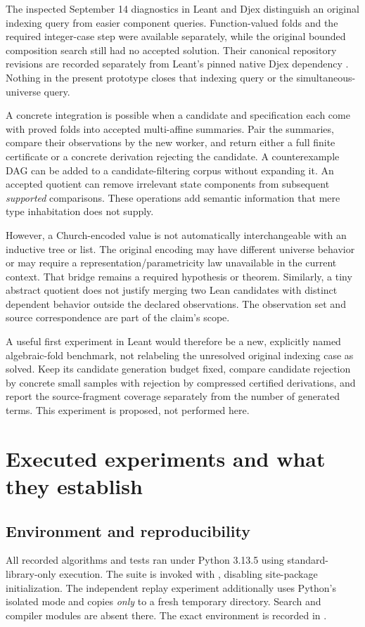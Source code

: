 \documentclass[11pt,letterpaper]{article}
\theoremstyle{definition}\newtheorem{definition}[theorem]{Definition}
\theoremstyle{remark}\newtheorem{remark}[theorem]{Remark}
\newcommand{\code}[1]{\texttt{\detokenize{#1}}}
\begin{document}
The inspected September 14 diagnostics in Leant and Djex distinguish an original indexing query from easier component queries. Function-valued folds and the required integer-case step were available separately, while the original bounded composition search still had no accepted solution. Their canonical repository revisions are recorded separately from Leant's pinned native Djex dependency \cite{leant,djex}. Nothing in the present prototype closes that indexing query or the simultaneous-universe query.

A concrete integration is possible when a candidate and specification each come with proved folds into accepted multi-affine summaries. Pair the summaries, compare their observations by the new worker, and return either a full finite certificate or a concrete derivation rejecting the candidate. A counterexample DAG can be added to a candidate-filtering corpus without expanding it. An accepted quotient can remove irrelevant state components from subsequent \emph{supported} comparisons. These operations add semantic information that mere type inhabitation does not supply.

However, a Church-encoded value is not automatically interchangeable with an inductive tree or list. The original encoding may have different universe behavior or may require a representation/parametricity law unavailable in the current context. That bridge remains a required hypothesis or theorem. Similarly, a tiny abstract quotient does not justify merging two Lean candidates with distinct dependent behavior outside the declared observations. The observation set and source correspondence are part of the claim's scope.

A useful first experiment in Leant would therefore be a new, explicitly named algebraic-fold benchmark, not relabeling the unresolved original indexing case as solved. Keep its candidate generation budget fixed, compare candidate rejection by concrete small samples with rejection by compressed certified derivations, and report the source-fragment coverage separately from the number of generated terms. This experiment is proposed, not performed here.

\section{Executed experiments and what they establish}
\label{sec:experiments}

\subsection{Environment and reproducibility}
All recorded algorithms and tests ran under Python 3.13.5 using standard-library-only execution. The suite is invoked with \code{python -S}, disabling site-package initialization. The independent replay experiment additionally uses Python's isolated mode and copies \emph{only}  to a fresh temporary directory. Search and compiler modules are absent there. The exact environment is recorded in .
\end{document}
